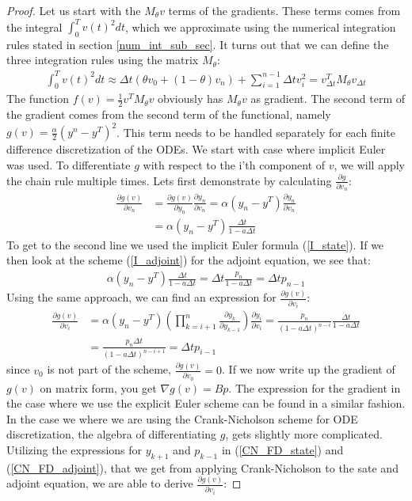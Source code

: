 \begin{proof}
Let us start with the $M_{\theta}v$ terms of the gradients. These terms comes from the integral $\int_0^T v(t)^2dt$, which we approximate using the numerical integration rules stated in section \ref{num_int_sub_sec}. It turns out that we can define the three integration rules using the matrix $M_{\theta}$:
\begin{align*}
\int_0^T v(t)^2dt\approx  \Delta t(\theta v_0 +(1-\theta)v_n) + \sum_{i=1}^{n-1} \Delta t v_i^2 = v_{\Delta t}^TM_{\theta} v_{\Delta t}
\end{align*} 
The function $f(v)=\frac{1}{2} v^TM_{\theta}v$ obviously has $M_{\theta}v$ as gradient. The second term of the gradient comes from the second term of the functional, namely $g(v)=\frac{\alpha}{2}(y^n -y^T)^2$. This term needs to be handled separately for each finite difference discretization of the ODEs. We start with case where implicit Euler was used. To differentiate $g$ with respect to the i'th component of $v$, we will apply the chain rule multiple times. Lets first demonstrate by calculating $\frac{\partial g}{\partial v_n}$:
\begin{align*}
\frac{\partial g(v)}{\partial v_n} &= \frac{\partial g(v)}{\partial y_n}\frac{\partial y_n}{\partial v_n} = \alpha(y_n -y^T)\frac{\partial y_n}{\partial v_n}\\
&= \alpha(y_n -y^T)\frac{\Delta t}{1-a\Delta t}
\end{align*}
To get to the second line we used the implicit Euler formula (\ref{I_state}). If we then look at the scheme (\ref{I_adjoint}) for the adjoint equation, we see that:
\begin{align*}
\alpha(y_n -y^T)\frac{\Delta t}{1-a\Delta t} = \Delta t\frac{p_n}{1-a\Delta t} = \Delta t p_{n-1}
\end{align*} 
Using the same approach, we can find an expression for $\frac{\partial g(v)}{\partial v_i}$: 
\begin{align*}
\frac{\partial g(v)}{\partial v_i} &= \alpha(y_n -y^T) (\prod_{k=i+1}^{n}\frac{\partial y_{k}}{\partial y_{k-1}}) \frac{\partial y_i}{\partial v_{i}} = \frac{p_n}{(1-a\Delta t)^{n-i}}\frac{\Delta t}{1-a\Delta t} \\
&= \frac{p_n\Delta t}{(1-a\Delta t)^{n-i+1}}=\Delta t p_{i-1}
\end{align*}
since $v_0$ is not part of the scheme, $\frac{\partial g(v)}{\partial v_0}=0$. If we now write up the gradient of $g(v)$ on matrix form, you get $\nabla g(v) = Bp$. The expression for the gradient in the case where we use the explicit Euler scheme can be found in a similar fashion. In the case we where we are using the Crank-Nicholson scheme for ODE discretization, the algebra of differentiating $g$, gets slightly more complicated. Utilizing the expressions for $y_{k+1}$ and $p_{k-1}$ in (\ref{CN_FD_state}) and (\ref{CN_FD_adjoint}), that we get from applying Crank-Nicholson to the sate and adjoint equation, we are able to derive $\frac{\partial g(v)}{\partial v_i}$:

\end{proof}
